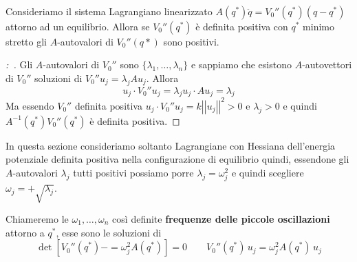 \documentclass[11pt,a4paper,twoside]{book}
\newenvironment{lemma}[1][\empty]{\begin{Lemma}{
\ifx\empty#1\relax\else\mdseries\itshape#1\\\fi
}{}}{\end{Lemma}}
\newenvironment{dimo}[1][\proofname]{
	\begin{tcolorbox}[
	breakable, 
	enhanced, 
	interior hidden, 
	frame hidden, 
	borderline west = {1pt}{0pt}{gray}, 
	top=0pt, bottom=0pt, left=0pt]
\begin{proof}[#1:~]
}
{
\end{proof}
\end{tcolorbox}
}
\theoremstyle{esss}
\theoremstyle{dotless}
\numberwithin{equation}{section} %
\begin{document}
\begin{lemma}\label{lemmaFrequenze}
Consideriamo il sistema Lagrangiano linearizzato $A(q^*)\ddot{q}=V_0''(q^*)(q-q^*)$ attorno ad un equilibrio. Allora se $V_0''(q^*)$ è definita positiva con $q^*$ minimo stretto gli $A$-autovalori di $V_0''(q*)$ sono positivi.
\end{lemma}
\begin{dimo}
Gli $A$-autovalori di $V_0''$ sono $\{\lambda_1,\dots,\lambda_n\}$ e sappiamo che esistono $A$-autovettori di $V_0''$ soluzioni di $V_0''u_j=\lambda_j A u_j$.
Allora
\[
u_j\cdot V_0'' u_j = \lambda_j u_j \cdot A u_j =\lambda_j
\]
Ma essendo $V_0''$ definita positiva $u_j\cdot V_0'' u_j = k \left|\left|u_j\right|\right|^2>0$ e $\lambda_j>0$ e quindi $A^{-1}(q^*)V_0''(q^*)$ è definita positiva.\qedhere
\end{dimo}

In questa sezione consideriamo soltanto Lagrangiane con Hessiana dell'energia potenziale definita positiva nella configurazione di equilibrio quindi, essendone gli $A$-autovalori $\lambda_j$ tutti positivi possiamo porre $\lambda_j=\omega_j^2$ e quindi scegliere $\omega_j=+\sqrt{\lambda_j}$.

Chiameremo le $\omega_1,\dots,\omega_n$ così definite \textbf{frequenze delle piccole oscillazioni} attorno a $q^*$, esse sono le soluzioni di
\begin{equation}
\det{[V_0''(q^*)-=\omega_j^2A(q^*)]}=0 \qquad V_0''(q^*)\,u_j=\omega_j^2A(q^*)\,u_j
\end{equation}
\end{document}

